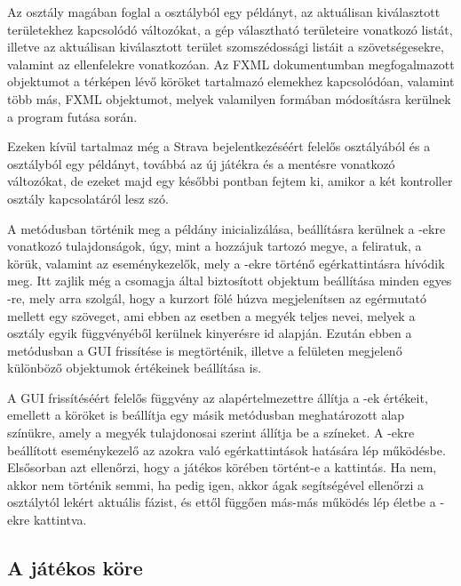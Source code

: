Az osztály magában foglal a  osztályból egy példányt, az aktuálisan kiválasztott területekhez kapcsolódó változókat, a gép választható területeire vonatkozó listát, illetve az aktuálisan kiválasztott terület szomszédossági listáit a szövetségesekre, valamint az ellenfelekre vonatkozóan.
Az FXML dokumentumban megfogalmazott  objektumot a térképen lévő köröket tartalmazó  elemekhez kapcsolódóan, valamint több más, FXML objektumot, melyek valamilyen formában módosításra kerülnek a program futása során. 

Ezeken kívül tartalmaz még a Strava bejelentkezéséért felelős  osztályából és a  osztályból egy példányt, továbbá az új játékra és a mentésre vonatkozó változókat, de ezeket majd egy későbbi pontban fejtem ki, amikor a két kontroller osztály kapcsolatáról lesz szó. 

A  metódusban történik meg a  példány inicializálása, beállításra kerülnek a -ekre vonatkozó tulajdonságok, úgy, mint a hozzájuk tartozó megye, a feliratuk, a körük, valamint az eseménykezelők, mely a -ekre történő egérkattintásra hívódik meg.
Itt zajlik még a  csomagja által biztosított  objektum beállítása minden egyes -re, mely arra szolgál, hogy a kurzort fölé húzva megjelenítsen az egérmutató mellett egy szöveget, ami ebben az esetben a megyék teljes nevei, melyek a  osztály egyik függvényéből kerülnek kinyerésre id alapján.
Ezután ebben a metódusban a GUI frissítése is megtörténik, illetve a felületen megjelenő különböző  objektumok értékeinek beállítása is. 

A GUI frissítéséért felelős függvény az alapértelmezettre állítja a -ek értékeit, emellett a köröket is beállítja egy másik metódusban meghatározott alap színükre, amely a megyék tulajdonosai szerint állítja be a színeket. A -ekre beállított eseménykezelő az azokra való egérkattintások hatására lép működésbe.
Elsősorban azt ellenőrzi, hogy a játékos körében történt-e a kattintás.
Ha nem, akkor nem történik semmi, ha pedig igen, akkor  ágak segítségével ellenőrzi a  osztálytól lekért aktuális fázist, és ettől függően más-más működés lép életbe a -ekre kattintva.

\subsection*{A játékos köre}


